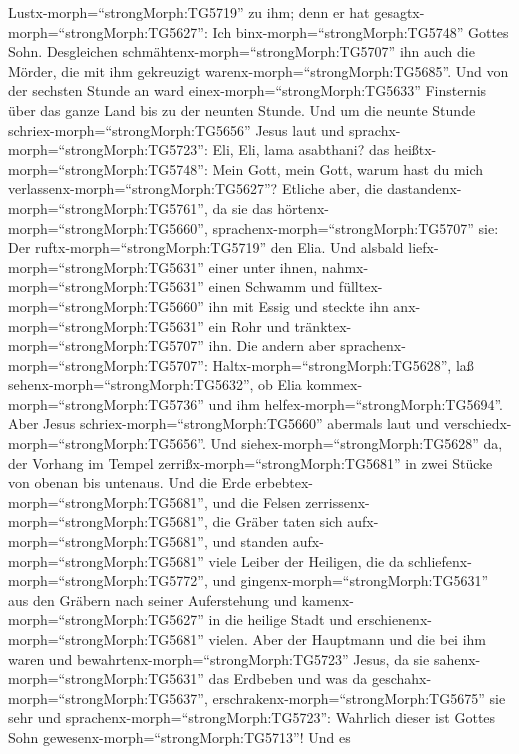 Lustx-morph=``strongMorph:TG5719'' zu ihm; denn er hat
gesagtx-morph=``strongMorph:TG5627'': Ich
binx-morph=``strongMorph:TG5748'' Gottes Sohn.  Desgleichen
schmähtenx-morph=``strongMorph:TG5707'' ihn auch die Mörder, die mit ihm
gekreuzigt warenx-morph=``strongMorph:TG5685''.  Und von
der sechsten Stunde an ward einex-morph=``strongMorph:TG5633''
Finsternis über das ganze Land bis zu der neunten Stunde. 
Und um die neunte Stunde schriex-morph=``strongMorph:TG5656'' Jesus laut
und sprachx-morph=``strongMorph:TG5723'': Eli, Eli, lama asabthani? das
heißtx-morph=``strongMorph:TG5748'': Mein Gott, mein Gott, warum hast du
mich verlassenx-morph=``strongMorph:TG5627''?  Etliche
aber, die dastandenx-morph=``strongMorph:TG5761'', da sie das
hörtenx-morph=``strongMorph:TG5660'',
sprachenx-morph=``strongMorph:TG5707'' sie: Der
ruftx-morph=``strongMorph:TG5719'' den Elia.  Und alsbald
liefx-morph=``strongMorph:TG5631'' einer unter ihnen,
nahmx-morph=``strongMorph:TG5631'' einen Schwamm und
fülltex-morph=``strongMorph:TG5660'' ihn mit Essig und steckte ihn
anx-morph=``strongMorph:TG5631'' ein Rohr und
tränktex-morph=``strongMorph:TG5707'' ihn.  Die andern aber
sprachenx-morph=``strongMorph:TG5707'':
Haltx-morph=``strongMorph:TG5628'', laß
sehenx-morph=``strongMorph:TG5632'', ob Elia
kommex-morph=``strongMorph:TG5736'' und ihm
helfex-morph=``strongMorph:TG5694''.  Aber Jesus
schriex-morph=``strongMorph:TG5660'' abermals laut und
verschiedx-morph=``strongMorph:TG5656''.  Und
siehex-morph=``strongMorph:TG5628'' da, der Vorhang im Tempel
zerrißx-morph=``strongMorph:TG5681'' in zwei Stücke von obenan bis
untenaus.  Und die Erde
erbebtex-morph=``strongMorph:TG5681'', und die Felsen
zerrissenx-morph=``strongMorph:TG5681'', die Gräber taten sich
aufx-morph=``strongMorph:TG5681'', und standen
aufx-morph=``strongMorph:TG5681'' viele Leiber der Heiligen, die da
schliefenx-morph=``strongMorph:TG5772'',  und
gingenx-morph=``strongMorph:TG5631'' aus den Gräbern nach seiner
Auferstehung und kamenx-morph=``strongMorph:TG5627'' in die heilige
Stadt und erschienenx-morph=``strongMorph:TG5681'' vielen. 
Aber der Hauptmann und die bei ihm waren und
bewahrtenx-morph=``strongMorph:TG5723'' Jesus, da sie
sahenx-morph=``strongMorph:TG5631'' das Erdbeben und was da
geschahx-morph=``strongMorph:TG5637'',
erschrakenx-morph=``strongMorph:TG5675'' sie sehr und
sprachenx-morph=``strongMorph:TG5723'': Wahrlich dieser ist Gottes Sohn
gewesenx-morph=``strongMorph:TG5713''!  Und es
